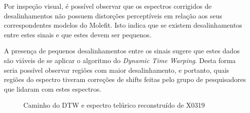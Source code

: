 Por inspeção visual, é possível observar que os espectros corrigidos de desalinhamentos não possuem distorções perceptíveis em relação aos seus correspondentes modelos do Molefit. Isto indica que se existem desalinhamentos entre estes sinais e que estes devem ser pequenos. 

A presença de pequenos desalinhamentos entre os sinais sugere que estes dados são viáveis de se aplicar o algoritmo do \textit{Dynamic Time Warping}. Desta forma seria possível observar regiões com maior desalinhamento, e portanto, quais regiões do espectro tiveram correções de shifts feitas pelo grupo de pesquisadores que lidaram com estes espectros.

\begin{figure}[htb]
  \centering
  \hfill
  \caption{Caminho do DTW e espectro telúrico reconstruído de X0319}
  \label{fig:x0319-dtw-telluric}
\end{figure}

